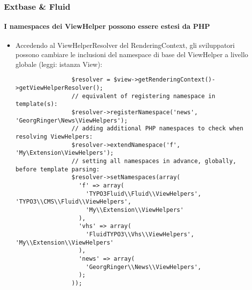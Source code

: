 \begin{frame}[fragile]
	\frametitle{Extbase \& Fluid}
	\framesubtitle{I namespaces dei ViewHelper possono essere estesi da PHP}

	\lstset{basicstyle=\tiny\ttfamily}

	\begin{itemize}

		\item Accedendo al ViewHelperResolver del RenderingContext,
			gli sviluppatori possono cambiare le inclusioni del namespace di base del ViewHelper a livello globale
			(leggi: istanza View):

			\begin{lstlisting}
				$resolver = $view->getRenderingContext()->getViewHelperResolver();
				// equivalent of registering namespace in template(s):
				$resolver->registerNamespace('news', 'GeorgRinger\News\ViewHelpers');
				// adding additional PHP namespaces to check when resolving ViewHelpers:
				$resolver->extendNamespace('f', 'My\Extension\ViewHelpers');
				// setting all namespaces in advance, globally, before template parsing:
				$resolver->setNamespaces(array(
				  'f' => array(
				    'TYPO3Fluid\\Fluid\\ViewHelpers', 'TYPO3\\CMS\\Fluid\\ViewHelpers',
				    'My\\Extension\\ViewHelpers'
				  ),
				  'vhs' => array(
				    'FluidTYPO3\\Vhs\\ViewHelpers', 'My\\Extension\\ViewHelpers'
				  ),
				  'news' => array(
				    'GeorgRinger\\News\\ViewHelpers',
				  );
				));
			\end{lstlisting}
	\end{itemize}

\end{frame}


